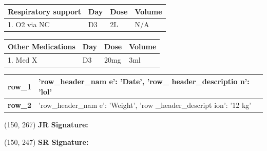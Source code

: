 \documentclass{article}
\begin{document}
\begin{minipage}[t]{0.45\textwidth}
\vspace{-2.73cm} %

    

    \begin{tabular}{|p{7cm}|p{1cm}|p{2cm}|p{2cm}|}
        \hline
        \textbf{Respiratory support} & \textbf{Day} & \textbf{Dose} & \textbf{Volume} \\
        \hline
       1. O2 via NC & D3 & 2L & N/A \\
        \hline
    \end{tabular}
    \vspace{0.2cm}

    \begin{tabular}{|p{7cm}|p{1cm}|p{2cm}|p{2cm}|}
        \hline
        \textbf{Other Medications} & \textbf{Day} & \textbf{Dose} & \textbf{Volume} \\
        \hline
       1. Med X & D3 & 20mg & 3ml \\
        \hline
    \end{tabular}
    \vspace{0.2cm}

\end{minipage}%
\hfill%
\begin{minipage}[t]{0.32\textwidth}

\hspace{1cm} %
    \begin{tabular}{|p{1.8cm}|p{2.5cm}|}
    \hline
     \begin{minipage}[t]{1.7cm}\textbf{row\_1}\end{minipage} & \begin{minipage}[t]{2.3cm}\raggedright {'row\_header\_nam
e': 'Date', 'row\_
header\_descriptio
n': 'lol'} \end{minipage} \\
        \hline
 \begin{minipage}[t]{1.7cm}\textbf{row\_2}\end{minipage} & \begin{minipage}[t]{2.3cm}\raggedright {'row\_header\_nam
e': 'Weight', 'row
\_header\_descript
ion': '12 kg'} \end{minipage} \\
        \hline

    \end{tabular}
\end{minipage}

\begin{textblock}{70}(150, 267)
    \textbf{JR Signature:}
\end{textblock}

\begin{textblock}{70}(150, 247)
    \textbf{SR Signature:}
\end{textblock}
\end{document}
